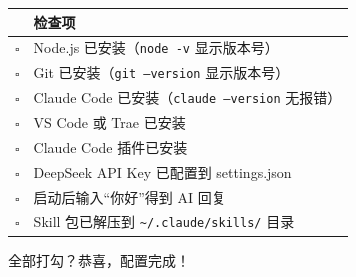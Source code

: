 \documentclass[12pt,a4paper]{ctexart}
\begin{document}
{
\centering
\begin{tabular}{>{\centering\arraybackslash}p{0.6cm}>{\RaggedRight\arraybackslash}p{13.9cm}}
\toprule
& \textbf{检查项} \\
\midrule
$\square$ & Node.js 已安装（\texttt{node -v} 显示版本号） \\
\midrule
$\square$ & Git 已安装（\texttt{git --version} 显示版本号） \\
\midrule
$\square$ & Claude Code 已安装（\texttt{claude --version} 无报错） \\
\midrule
$\square$ & VS Code 或 Trae 已安装 \\
\midrule
$\square$ & Claude Code 插件已安装 \\
\midrule
$\square$ & DeepSeek API Key 已配置到 settings.json \\
\midrule
$\square$ & 启动后输入``你好''得到 AI 回复 \\
\midrule
$\square$ & Skill 包已解压到 \texttt{\textasciitilde/.claude/skills/} 目录 \\
\bottomrule
\end{tabular}
\par}

\vspace{12pt}

全部打勾？恭喜，配置完成！
\end{document}
